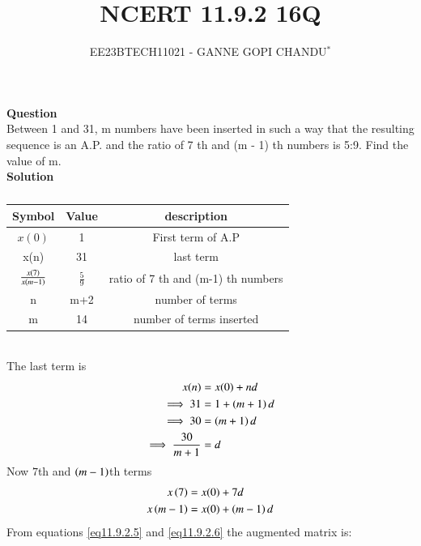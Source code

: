 \documentclass[journal,12pt,onecolumn]{IEEEtran}
\theoremstyle{remark}
\begin{document}

\vspace{3cm}
\title{NCERT 11.9.2 16Q}
\author{EE23BTECH11021 - GANNE GOPI CHANDU$^{*}$%
}
\maketitle
\bigskip
\renewcommand{\thefigure}{\theenumi}
\renewcommand{\thetable}{\theenumi}

\textbf{Question}\\
Between 1 and 31, m numbers have been inserted in such a way that the resulting sequence is an A.P. and 
the ratio of 7
th and (m - 1)
th numbers is 5:9. Find the value of m.\\
\textbf{Solution}\\
\begin{table}[!h]
\begin{center}
\renewcommand\thetable{1}
\begin{tabular}{ |c|c|c| } 
  \hline
    Symbol & Value & description \\ 
  \hline
  $x(0)$ & 1 & First term of A.P  \\ 
  \hline
  x(n) & 31 & last term \\
  \hline
  $\frac{x\left(7\right)}{x\left(m-1\right)}$ & $\frac{5}{9}$ & ratio of 7 th and (m-1) th numbers\\ 
  \hline
  n & m+2 & number of terms \\
  \hline
  m & 14 & number of terms inserted \\
  \hline
\end{tabular}
\end{center}
\caption{}
\end{table}\\
The last term is
\begin{align}
x(n)&=x(0)+nd\\
\implies31 &= 1 + \left(m + 1\right)d \\
\implies30 &= \left(m + 1\right)d \\
\implies\frac{30}{m + 1} &= d \label{eq11.9.2.4}
\end{align}
Now $7$th and $\left(m-1\right)$th terms
\begin{align}
x\left(7\right) &= x(0) + 7d\label{eq11.9.2.5}\\
x\left(m-1\right) &= x(0) + \left(m-1\right)d\label{eq11.9.2.6}
\end{align}
From  equations \eqref{eq11.9.2.5} and \eqref{eq11.9.2.6} the augmented matrix is:\\
\end{document}
